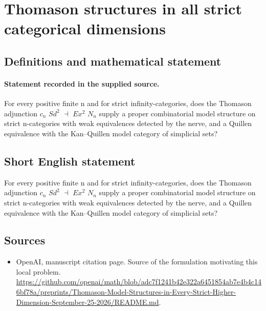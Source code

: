 \documentclass[11pt]{article}
\begin{document}
\section*{Thomason structures in all strict categorical dimensions}\label{30007509}
\subsection{Definitions and mathematical statement}
\paragraph{Statement recorded in the supplied source.}
For every positive finite n and for strict infinity-categories, does the Thomason adjunction $c_n$ $Sd^{2}$ $\dashv $ $Ex^{2}$ $N_n$ supply a proper combinatorial model structure on strict n-categories with weak equivalences detected by the nerve, and a Quillen equivalence with the Kan–Quillen model category of simplicial sets?
\subsection{Short English statement}
For every positive finite n and for strict infinity-categories, does the Thomason adjunction $c_n$ $Sd^{2}$ $\dashv $ $Ex^{2}$ $N_n$ supply a proper combinatorial model structure on strict n-categories with weak equivalences detected by the nerve, and a Quillen equivalence with the Kan–Quillen model category of simplicial sets?
\subsection{Sources}
\begin{itemize}
\item[S1] OpenAI, manuscript citation page. Source of the formulation motivating this local problem.
\url{https://github.com/openai/math/blob/adc7f1241b42e322a6451854ab7e4b4c146bf78a/preprints/Thomason-Model-Structures-in-Every-Strict-Higher-Dimension-September-25-2026/README.md}.
\end{itemize}
\end{document}
